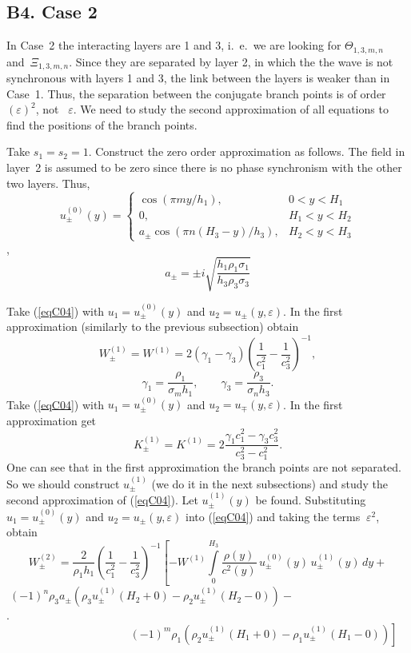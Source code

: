 \documentclass[12pt]{article}
\newcommand{\eps}{\varepsilon}
\begin{document}
\subsection*{B4. Case 2}

In Case~2 the interacting layers are 1 and 3, i.~e.\
we are looking for $\Theta_{1,3,m,n}$ and~$\Xi_{1,3,m,n}$.
Since they are separated by layer 2, in which the 
the wave is not synchronous with layers 1 and 3, the link between the layers is weaker than in Case~1. Thus, the separation between the conjugate branch points is of order $(\eps)^2$, not 
~$\eps$. We need to study the second approximation of all equations to find the positions of the branch points. 

Take $s_1 = s_2 = 1$. 
Construct the zero order approximation as follows. The field in layer~2 is assumed to be zero since 
there is no phase synchronism with the other two layers. Thus, 
\begin{equation}
u^{(0)}_\pm (y) = 
\left\{ \begin{array}{ll} 
\cos (\pi m y / h_1) ,               & 0<y<H_1 \\
0 ,                                  & H_1<y<H_2 \\
a_\pm \cos (\pi n (H_3 - y) / h_3) , & H_2<y<H_3
\end{array} \right.
\label{eqB24}
\end{equation},
\[
a_\pm =\pm i \sqrt{\frac{h_1 \rho_1 \sigma_1}{h_3 \rho_3 \sigma_3}}
\]
 
Take (\ref{eqC04}) with $u_1 = u^{(0)}_\pm (y)$ and $u_2 = u_\pm (y, \eps)$. 
In the first approximation (similarly to the previous subsection) obtain 
\begin{equation}
W^{(1)}_\pm = W^{(1)} = 2 (\gamma_1 - \gamma_3) \left( \frac{1}{c_1^2} - 
\frac{1}{c_3^2} \right)^{-1},
\label{eqB25}
\end{equation} 
\[
\gamma_1 = \frac{\rho_1}{\sigma_m h_1},
\qquad
\gamma_3 = \frac{\rho_3}{\sigma_n h_3}.
\]
Take (\ref{eqC04}) with $u_1 = u^{(0)}_\pm (y)$ and $u_2 = u_\mp (y, \eps)$. 
In the first approximation get
\begin{equation}
K^{(1)}_\pm = K^{(1)} = 2 \frac{\gamma_1 c_1^2 - \gamma_3 c_3^2}{c_3^2 - c_1^2}. 
\label{eqB26}
\end{equation} 
One can see that in the first approximation the branch points are not separated. 
So we should construct $u^{(1)}_\pm$ (we do it in the next subsections) and study the second approximation of (\ref{eqC04}). 
Let $u_\pm^{(1)} (y)$ be found. Substituting 
$u_1 = u^{(0)}_\pm (y)$ and $u_2 = u_\pm (y, \eps)$ into (\ref{eqC04})
and taking the terms $~\eps^2$, obtain 
\[
W^{(2)}_{\pm} = \frac{2}{\rho_1 h_1} \left( \frac{1}{c_1^2}-\frac{1}{c_3^2} \right)^{-1}
\left[
-W^{(1)} \int \limits_0^{H_3} 
\frac{\rho(y)}{c^2(y)}\, u^{(0)}_\pm (y)\, u^{(1)}_\pm (y) \, dy
 + \right.
\]
\[
(-1)^n \rho_3 a_\pm (\rho_3 u^{(1)}_\pm (H_2 + 0)-\rho_2 u^{(1)}_\pm (H_2 - 0)) 
- 
\qquad \qquad \qquad \qquad \qquad  
\].
\begin{equation} 
\qquad \qquad \qquad \qquad \qquad 
\left.
 (-1)^m \rho_1 (\rho_2 u^{(1)}_\pm (H_1 + 0)-\rho_1 u^{(1)}_\pm (H_1 - 0)) 
\right] 
\label{eqB27}
\end{equation}
\end{document}
